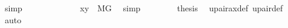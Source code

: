 \begin{isabellebody}
\ simp\isanewline
\ \ \ \ \isamarkupfalse%
\ {}\ \isanewline
\ \ \ \ \isamarkupfalse%
\ {\isachardoublequoteopen}{\isacharbraceleft}{\kern0pt}x{\isacharcomma}{\kern0pt}y{\isacharbraceright}{\kern0pt}\ {\isasymin}\ M{\isacharbrackleft}{\kern0pt}G{\isacharbrackright}{\kern0pt}{\isachardoublequoteclose}\ \isamarkupfalse%
\ simp\isanewline
\ \ \isacommand{{\isacharbraceright}{\kern0pt}}\isamarkupfalse%
\isanewline
\ \ \isamarkupfalse%
\ \isamarkupfalse%
\ {\isacharquery}{\kern0pt}thesis\ \isamarkupfalse%
\ upair{\isacharunderscore}{\kern0pt}ax{\isacharunderscore}{\kern0pt}def\ upair{\isacharunderscore}{\kern0pt}def\ \isamarkupfalse%
\ auto\isanewline
{}\isamarkupfalse%
%
\endisatagproof
{\isafoldproof}%
%
\isadelimproof
\isanewline
%
\endisadelimproof
\isanewline
{}\isamarkupfalse%
\ \ \isanewline
%
\isadelimtheory
%
\endisadelimtheory
%
\isatagtheory
{}\isamarkupfalse%
%
\endisatagtheory
{\isafoldtheory}%
%
\isadelimtheory
%
\endisadelimtheory
%
\end{isabellebody}%
\endinput
